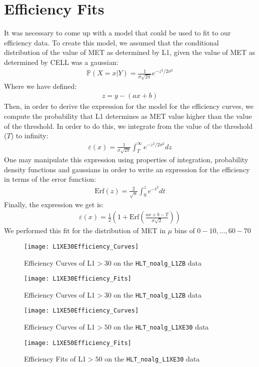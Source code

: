 \section{Efficiency Fits}
It was necessary to come up with a model that could be used to fit to our efficiency data. To create this model, we assumed that the conditional distribution of the value of MET as determined by L1, given the value of MET as determined by CELL was a gaussian:
\begin{align}
		\mathbb{P}(X=x|Y) = \frac{1}{\sigma \sqrt{2\pi}} e^{-z^2/2\sigma^2}
\end{align}
Where we have defined:
\begin{align}
		z=y-(ax+b)
\end{align}
Then, in order to derive the expression for the model for the efficiency curves, we compute the probability that L1 determines as MET value higher than the value of the threshold. In order to do this, we integrate from the value of the threshold ($T$) to infinity:
\begin{align}
		\varepsilon(x)=\frac{1}{\sigma \sqrt{2\pi}}\int_{T}^{\infty}e^{-z^2/2\sigma^2}dz
\end{align}
One may manipulate this expression using properties of integration, probability density functions and gaussians in order to write an expression for the efficiency in terms of the error function:
\begin{align}
		\textrm{Erf}(z)=\frac{2}{\sqrt{\pi}}\int_0^{z}e^{-t^2}dt
\end{align}
Finally, the expression we get is:
\begin{align}
		\varepsilon(x)=\frac{1}{2}\left( 1+\textrm{Erf}\left( \frac{ax+b-T}{\sigma\sqrt{2}} \right) \right)
\end{align}
We performed this fit for the distribution of MET in $\mu$ bins of $0-10,\ldots,60-70$
\pagebreak
\begin{figure}[h]
		\centering
		\texttt{[image: L1XE30Efficiency\_Curves]}
		\caption{Efficiency Curves of L1$>30$ on the \texttt{HLT\_noalg\_L1ZB} data}
\end{figure}
\begin{figure}[h]
		\centering
		\texttt{[image: L1XE30Efficiency\_Fits]}
		\caption{Efficiency Curves of L1$>30$ on the \texttt{HLT\_noalg\_L1ZB} data}
\end{figure}
\begin{figure}[h]
		\centering
		\texttt{[image: L1XE50Efficiency\_Curves]}
		\caption{Efficiency Curves of L1$>50$ on the \texttt{HLT\_noalg\_L1XE30} data}
\end{figure}
\begin{figure}[h]
		\centering
		\texttt{[image: L1XE50Efficiency\_Fits]}
		\caption{Efficiency Fits of L1$>50$ on the \texttt{HLT\_noalg\_L1XE30} data}
\end{figure}
